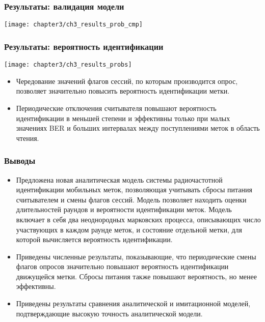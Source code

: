 \begin{frame}
    \frametitle{Результаты: валидация модели}
    \begin{center}
        \texttt{[image: chapter3/ch3\_results\_prob\_cmp]}
    \end{center}
\end{frame}

\begin{frame}
    \frametitle{Результаты: вероятность идентификации}
    \begin{center}
        \texttt{[image: chapter3/ch3\_results\_probs]}
    \end{center}
    \vfill
    \begin{itemize}
        \item Чередование значений флагов сессий, по которым производится опрос, позволяет значительно повысить вероятность идентификации метки.
        \item Периодические отключения считывателя повышают вероятность идентификации в меньшей степени и эффективны только при малых значениях BER и больших интервалах между поступлениями меток в область чтения.
    \end{itemize}
\end{frame}

\begin{frame}
    \frametitle{Выводы}
    \footnotesize
    \begin{itemize}
        \item Предложена новая аналитическая модель системы радиочастотной идентификации мобильных меток, позволяющая учитывать сбросы питания считывателем и смены флагов сессий. Модель позволяет находить оценки длительностей раундов и вероятности идентификации меток. Модель включает в себя два неоднородных марковских процесса, описывающих число участвующих в каждом раунде меток, и состояние отдельной метки, для которой вычисляется вероятность идентификации.
        \item Приведены численные результаты, показывающие, что периодические смены флагов опросов значительно повышают вероятность идентификации движущейся метки. Сбросы питания также повышают вероятность, но менее эффективны.
        \item Приведены результаты сравнения аналитической и имитационной моделей, подтверждающие высокую точность аналитической модели.
    \end{itemize}
\end{frame}





